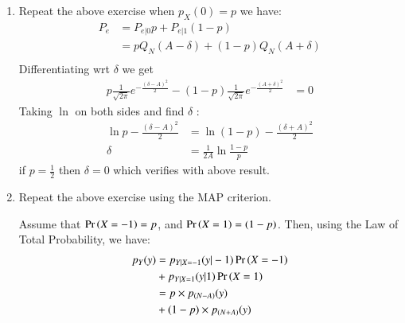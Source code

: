 \documentclass[journal,12pt,twocolumn]{IEEEtran}
\renewcommand\thesection{\arabic{section}}
\begin{document}
\begin{enumerate}[label=\thesection.\arabic*
,ref=\thesection.\theenumi]
\item Repeat the above exercise when $p_{X}(0) = p$
\solution
we have:
\begin{align*}
    P_e &= P_{e|0} p+ P_{e|1} (1-p) \\
    &= p Q_N (A - \delta) + (1-p)Q_N (A + \delta) \\
\end{align*}
Differentiating wrt $\delta$ we get
\begin{align*}
p \frac{1}{\sqrt{2\pi}} e^{-\frac{(\delta - A)^2}{2}} - (1-p)\frac{1}{\sqrt{2\pi}} e^{-\frac{(A + \delta)^2}{2}} &= 0
\end{align*}
 Taking $\ln$ on both sides  and find $\delta$ :
 \begin{align*}
    \ln{p} - \frac{(\delta - A)^2}{2} &= \ln{(1-p)} - \frac{(\delta + A)^2}{2} \\
     \delta &= \frac{1}{2A} \ln{\frac{1-p}{p}}
 \end{align*}
if $p = \frac{1}{2}$ then $\delta = 0$ which verifies with above result.


\item Repeat the above exercise using the MAP criterion.

\solution
Assume that $\Pr\left(X = -1\right) = p$, and $\Pr\left(X = 1\right) = (1-p)$. Then, using the Law of Total Probability,
we have:
\begin{align*}
\nonumber p_Y(y) &= p_{Y|X = -1}(y|-1) \Pr\left(X = -1\right) \\
&+ p_{Y| X = 1}(y|1) \Pr\left(X = 1\right) \\
\nonumber &= p \times p_{(N - A)}(y) \\
&+ (1-p) \times p_{(N+A)} (y) 
\end{align*}
 

\end{enumerate}
\end{document}
